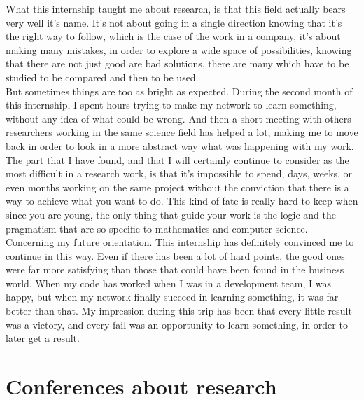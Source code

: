 \documentclass{report}
\begin{document}
	What this internship taught me about research, is that this field actually bears very well it's name. It's not about going in a single direction knowing that it's the right way to follow, which is the case of the work in a company, it's about making many mistakes, in order to explore a wide space of possibilities, knowing that there are not just good are bad solutions, there are many which have to be studied to be compared and then to be used.\\
	
	But sometimes things are too as bright as expected. During the second month of this internship, I spent hours trying to make my network to learn something, without any idea of what could be wrong. And then a short meeting with others researchers working in the same science field has helped a lot, making me to move back in order to look in a more abstract way what was happening with my work. The part that I have found, and that I will certainly continue to consider as the most difficult in a research work, is that it's impossible to spend, days, weeks, or even months working on the same project without the conviction that there is a way to achieve what you want to do. This kind of fate is really hard to keep when since you are young, the only thing that guide your work is the logic and the pragmatism that are so specific to mathematics and computer science.\\
	
	Concerning my future orientation. This internship has definitely convinced me to continue in this way. Even if there has been a lot of hard points, the good ones were far more satisfying than those that could have been found in the business world. When my code has worked when I was in a development team, I was happy, but when my network finally succeed in learning something, it was far better than that. My impression during this trip has been that every little result was a victory, and every fail was an opportunity to learn something, in order to later get a result.
	
	\section{Conferences about research}
	
\end{document}

